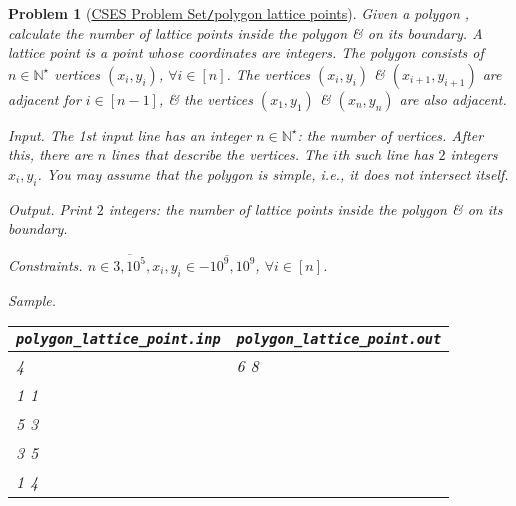 \documentclass{article}
\newtheorem{problem}{Problem}
\begin{document}
\begin{problem}[\href{https://cses.fi/problemset/task/2193}{CSES Problem Set{\tt/}polygon lattice points}]
    Given a polygon , calculate the number of lattice points inside the polygon \& on its boundary. A {\rm lattice point} is a point whose coordinates are integers. The polygon consists of $n\in\mathbb{N}^\star$ vertices $(x_i,y_i)$, $\forall i\in[n]$. The vertices $(x_i,y_i)$ \& $(x_{i+1},y_{i+1})$ are adjacent for $i\in[n - 1]$, \& the vertices $(x_1,y_1)$ \& $(x_n,y_n)$ are also adjacent.
    \item {\sf Input.} The 1st input line has an integer $n\in\mathbb{N}^\star$:  the number of vertices. After this, there are $n$ lines that describe the vertices. The $i$th such line has $2$ integers $x_i,y_i$. You may assume that the polygon is simple, i.e., it does not intersect itself.
    \item {\sf Output.} Print $2$ integers: the number of lattice points inside the polygon \& on its boundary.
    \item {\sf Constraints.} $n\in\overline{3,10^5},x_i,y_i\in\overline{-10^9,10^9}$, $\forall i\in[n]$.
    \item {\sf Sample.}
    \begin{table}[H]
        \centering
        \begin{tabular}{|l|l|}
            \hline
            \verb|polygon_lattice_point.inp| & \verb|polygon_lattice_point.out| \\
            \hline
            4 & 6 8 \\
            1 1 & \\
            5 3 & \\
            3 5 & \\
            1 4 & \\
            \hline
        \end{tabular}
    \end{table}
\end{problem}
\end{document}
